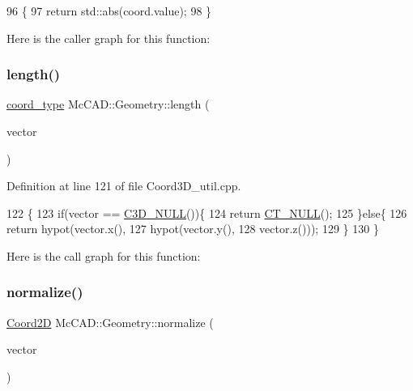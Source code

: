 \begin{DoxyCode}
96                            \{
97     \textcolor{keywordflow}{return} std::abs(coord.value);
98 \}
\end{DoxyCode}
Here is the caller graph for this function\+:
\mbox{\label{namespaceMcCAD_1_1Geometry_ac903d712197cbd7f2738fef2e3beb258}} 
\subsubsection{\texorpdfstring{length()}{length()}\hspace{0.1cm}{\footnotesize\ttfamily [3/3]}}
{\footnotesize\ttfamily \hyperlink{namespaceMcCAD_1_1Geometry_ac043b37a4a7e849fca22869e1982d2f8}{coord\+\_\+type} Mc\+C\+A\+D\+::\+Geometry\+::length (\begin{DoxyParamCaption}\item[{const \hyperlink{classMcCAD_1_1Geometry_1_1Coord3D}{Coord3D} \&}]{vector }\end{DoxyParamCaption})}



Definition at line 121 of file Coord3\+D\+\_\+util.\+cpp.


\begin{DoxyCode}
122                               \{
123     \textcolor{keywordflow}{if}(vector == \hyperlink{namespaceMcCAD_1_1Geometry_ae08bc63c64f6c022b784d73e474724f3}{C3D\_NULL}())\{
124         \textcolor{keywordflow}{return} \hyperlink{namespaceMcCAD_1_1Geometry_a7a1a1f1e3e0547cde4d81dec1a126c28}{CT\_NULL}();
125     \}\textcolor{keywordflow}{else}\{
126         \textcolor{keywordflow}{return} hypot(vector.x(),
127                      hypot(vector.y(),
128                            vector.z()));
129     \}
130 \}
\end{DoxyCode}
Here is the call graph for this function\+:
\mbox{\label{namespaceMcCAD_1_1Geometry_ad39938584229d5d21cf112bf47a0d852}} 
\subsubsection{\texorpdfstring{normalize()}{normalize()}\hspace{0.1cm}{\footnotesize\ttfamily [1/2]}}
{\footnotesize\ttfamily \hyperlink{classMcCAD_1_1Geometry_1_1Coord2D}{Coord2D} Mc\+C\+A\+D\+::\+Geometry\+::normalize (\begin{DoxyParamCaption}\item[{const \hyperlink{classMcCAD_1_1Geometry_1_1Coord2D}{Coord2D} \&}]{vector }\end{DoxyParamCaption})}



